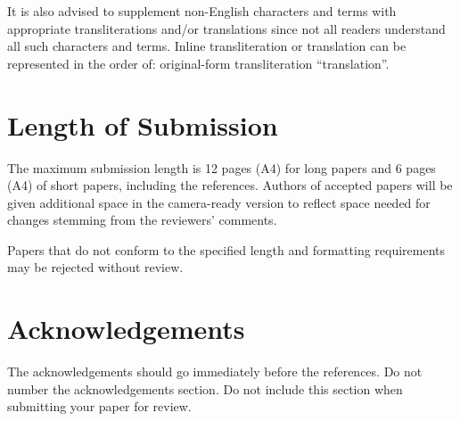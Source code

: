 \documentclass[11pt]{article}
\begin{document}
It is also advised to supplement non-English characters and terms
with appropriate transliterations and/or translations
since not all readers understand all such characters and terms.
Inline transliteration or translation can be represented in
the order of: original-form transliteration ``translation''.

\section{Length of Submission}
\label{sec:length}

The maximum submission length is 12 pages (A4) for long papers and 6 pages (A4) of short papers, including the references. Authors of accepted papers will be given additional space in the camera-ready version to reflect space needed for changes stemming from the reviewers’ comments. 

Papers that do not conform to the specified length and formatting requirements may be rejected without review.

\iffalse
For papers accepted to the main conference, we will invite authors to provide a translation
of the title and abstract and a 1-2 page synopsis of the paper in a second
language of the authors' choice. Appropriate languages include but are not
limited to authors' native languages, languages spoken in the authors' place
of affiliation, and languages that are the focus of the research presented.
\fi

\section*{Acknowledgements}

The acknowledgements should go immediately before the references.  Do
not number the acknowledgements section. Do not include this section
when submitting your paper for review.






\end{document}
